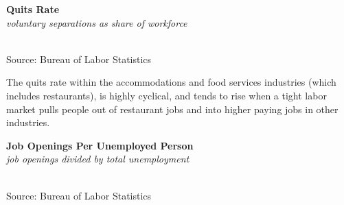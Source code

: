 \documentclass{report}
\makeatletter
\newcommand{\tbllink}[1]{\href{https://raw.githubusercontent.com/bdecon/US-chartbook/master/chartbook/data/#1}{\faTable}}
\newcommand*\short[1]{\expandafter\@gobbletwo\number\numexpr#1\relax}
\newcommand{\stdnode}[3]{\node[below, align=left, shift=({#1,#2})]{#3};}
\newcommand{\dateaxisticks}{
		date coordinates in=x, axis line style={draw=none},
		xmax={2021-06-15},
		max space between ticks=40,	    
		xtick={{1990-01-01}, {1992-01-01}, {1994-01-01}, 
			{1996-01-01}, {1998-01-01}, {2000-01-01}, 
			{2002-01-01}, {2004-01-01}, {2006-01-01},
			{2008-01-01}, {2010-01-01}, {2012-01-01}, {2014-01-01},
		    {2016-01-01}, {2018-01-01}, {2020-01-01}},
		minor xtick={{1989-01-01}, {1991-01-01}, {1993-01-01},
			{1995-01-01}, {1997-01-01}, {1999-01-01}, 
			{2001-01-01}, {2003-01-01}, {2005-01-01}, {2007-01-01},
		    {2009-01-01}, {2011-01-01}, {2013-01-01}, {2015-01-01},
		    {2017-01-01}, {2019-01-01}, {2021-01-01}},
		enlarge y limits={0.06}, enlarge x limits={0.01},
		}
\newcommand{\shdateaxisticks}{
		date coordinates in=x, axis line style={draw=none},
		xmax={2021-06-15},
		max space between ticks=40,	    
		xtick={{1990-01-01}, {1995-01-01}, {2000-01-01}, 
			{2005-01-01}, {2010-01-01}, {2015-01-01}, {2020-01-01}},
		minor xtick={},
		enlarge y limits={0.06}, enlarge x limits={0.01},
		}
\newcommand{\bbar}[2]{extra #1 ticks = {{#2}}, extra #1 tick labels = ,
		extra #1 tick style = {grid=major, grid style={thick, black!25}},}
\newcommand{\stdline}[4]{\addplot[very thick, no markers, color=#1] 
		table [x=#2, y=#3, col sep=comma] {#4};	}
\newcommand{\thinline}[4]{\addplot[no markers, color=#1] 
		table [x=#2, y=#3, col sep=comma] {#4};	}
\newcommand{\rebars}{
		\fill[color=black!10] (axis cs:{2007-12-01},\pgfkeysvalueof{/pgfplots/ymin}) rectangle 
			(axis cs:{2009-07-01}, \pgfkeysvalueof{/pgfplots/ymax});
		\fill[color=black!10] (axis cs:{2001-03-01},\pgfkeysvalueof{/pgfplots/ymin}) rectangle 
			(axis cs:{2001-11-01}, \pgfkeysvalueof{/pgfplots/ymax});
		\fill[color=black!10] (axis cs:{2020-02-01},\pgfkeysvalueof{/pgfplots/ymin}) rectangle 
			(axis cs:{2021-06-15}, \pgfkeysvalueof{/pgfplots/ymax});}
\makeatother
\begin{document}
{{\begin{minipage}{0.38\textwidth}
\normalsize \textbf{Quits Rate}\\
\footnotesize{\textit{voluntary separations as share of workforce}}\\
\hspace*{-2mm} \\
\footnotesize{Source: Bureau of Labor Statistics} \hfill \tbllink{quits.csv}
\end{minipage}
\hspace{9mm}
\begin{minipage}{0.31\textwidth}
\small The quits rate within the accommodations and food services industries (which includes restaurants), is highly cyclical, and tends to rise when a tight labor market pulls people out of restaurant jobs and into higher paying jobs in other industries. 
\end{minipage}
\newpage
\begin{minipage}{0.76\textwidth}
\small 
\vspace{1mm}

\normalsize \textbf{Job Openings Per Unemployed Person}\\
\footnotesize{\textit{job openings divided by total unemployment}}\\
\hspace*{-2mm} \\
\footnotesize{Source: Bureau of Labor Statistics} \hfill \tbllink{unjo.csv}
\end{minipage}
\vspace{7mm}

}}
\end{document}
